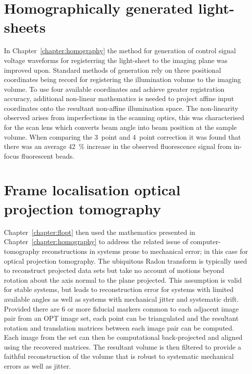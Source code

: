 \section{Homographically generated light-sheets}
In Chapter~\ref{chapter:homography} the method for generation of control signal voltage waveforms for registerring the light-sheet to the imaging plane was improved upon.
Standard methods of generation rely on three positional coordinates being record for registering the illumination volume to the imaging volume.
To use four available coordinates and achieve greater registration accuracy, additional non-linear mathematics is needed to project affine input coordinates onto the resultant non-affine illumination space.
The non-linearity observed arises from imperfections in the scanning optics, this was characterised for the scan lens which converts beam angle into beam position at the sample volume.
When comparing the 3~point and 4~point correction it was found that there was an average \SI{42}{\percent} increase in the observed fluorescence signal from in-focus fluorescent beads.

\section{Frame localisation optical projection tomography}
Chapter~\ref{chapter:flopt} then used the mathematics presented in Chapter~\ref{chapter:homography} to address the related issue of computer-tomography reconstructions in systems prone to mechanical error; in this case for optical projection tomography.
The ubiquitous Radon transform is typically used to reconstruct projected data sets but take no account of motions beyond rotation about the axis normal to the plane projected.
This assumption is valid for stable systems, but leads to reconstruction error for systems with limited available angles as well as systems with mechanical jitter and systematic drift.
Provided there are 6 or more fiducial markers common to each adjacent image pair from an \gls{OPT} image set, each point can be triangulated and the resultant rotation and translation matrices between each image pair can be computed.
Each image from the set can then be computational back-projected and aligned using the recovered matrices.
The resultant volume is then filtered to provide a faithful reconstruction of the volume that is robust to systematic mechanical errors as well as jitter.

